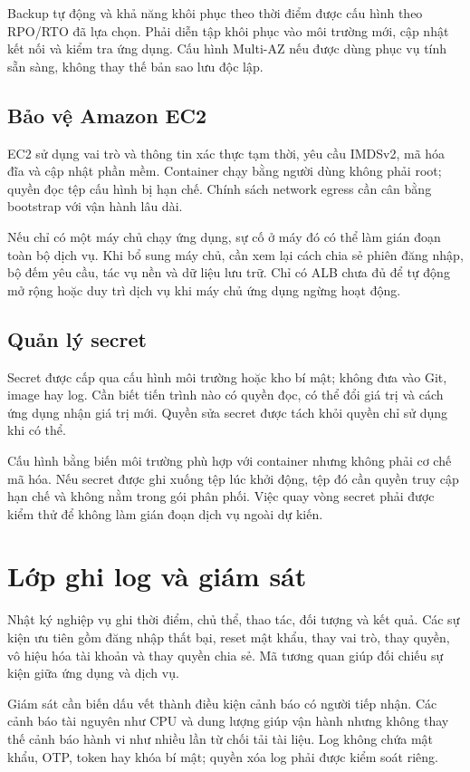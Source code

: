 Backup tự động và khả năng khôi phục theo thời điểm được cấu hình theo RPO/RTO đã lựa chọn. Phải diễn tập khôi phục vào môi trường mới, cập nhật kết nối và kiểm tra ứng dụng. Cấu hình Multi-AZ nếu được dùng phục vụ tính sẵn sàng, không thay thế bản sao lưu độc lập.
\subsection{Bảo vệ Amazon EC2}
EC2 sử dụng vai trò và thông tin xác thực tạm thời, yêu cầu IMDSv2, mã hóa đĩa và cập nhật phần mềm. Container chạy bằng người dùng không phải root; quyền đọc tệp cấu hình bị hạn chế. Chính sách network egress cần cân bằng bootstrap với vận hành lâu dài.

Nếu chỉ có một máy chủ chạy ứng dụng, sự cố ở máy đó có thể làm gián đoạn toàn bộ dịch vụ. Khi bổ sung máy chủ, cần xem lại cách chia sẻ phiên đăng nhập, bộ đếm yêu cầu, tác vụ nền và dữ liệu lưu trữ. Chỉ có ALB chưa đủ để tự động mở rộng hoặc duy trì dịch vụ khi máy chủ ứng dụng ngừng hoạt động.
\subsection{Quản lý secret}
Secret được cấp qua cấu hình môi trường hoặc kho bí mật; không đưa vào Git, image hay log. Cần biết tiến trình nào có quyền đọc, có thể đổi giá trị và cách ứng dụng nhận giá trị mới. Quyền sửa secret được tách khỏi quyền chỉ sử dụng khi có thể.

Cấu hình bằng biến môi trường phù hợp với container nhưng không phải cơ chế mã hóa. Nếu secret được ghi xuống tệp lúc khởi động, tệp đó cần quyền truy cập hạn chế và không nằm trong gói phân phối. Việc quay vòng secret phải được kiểm thử để không làm gián đoạn dịch vụ ngoài dự kiến.

\section{Lớp ghi log và giám sát}
Nhật ký nghiệp vụ ghi thời điểm, chủ thể, thao tác, đối tượng và kết quả. Các sự kiện ưu tiên gồm đăng nhập thất bại, reset mật khẩu, thay vai trò, thay quyền, vô hiệu hóa tài khoản và thay quyền chia sẻ. Mã tương quan giúp đối chiếu sự kiện giữa ứng dụng và dịch vụ.

Giám sát cần biến dấu vết thành điều kiện cảnh báo có người tiếp nhận. Các cảnh báo tài nguyên như CPU và dung lượng giúp vận hành nhưng không thay thế cảnh báo hành vi như nhiều lần từ chối tải tài liệu. Log không chứa mật khẩu, OTP, token hay khóa bí mật; quyền xóa log phải được kiểm soát riêng.

